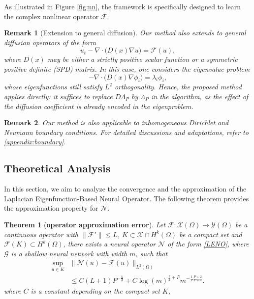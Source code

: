 \documentclass[preprint,12pt]{elsarticle}
\theoremstyle{plain}
\newtheorem{theorem}{Theorem}[section]
\newtheorem{remark}{Remark}[section]
\numberwithin{figure}{section}
\numberwithin{table}{section}
\newcommand{\jdall}[1]{{\color{black}#1}}
\begin{document}
As illustrated in Figure \ref{fig:nn}, the framework is specifically designed to learn the complex nonlinear operator $\mathcal{F}$.

\jdall{
\begin{remark}[Extension to general diffusion]
Our method also extends to general diffusion operators of the form
\begin{equation}
u_t - \nabla \cdot \big(D(x)\nabla u\big) = \mathcal{F}(u),
\end{equation}
where $D(x)$ may be either a strictly positive scalar function or a symmetric positive definite (SPD) matrix. In this case, one considers the eigenvalue problem
\begin{equation}
-\nabla \cdot \big(D(x)\nabla \phi_i\big) = \lambda_i \phi_i,
\end{equation}
whose eigenfunctions still satisfy $L^2$ orthogonality. Hence, the proposed method applies directly: it suffices to replace $D\Lambda_P$ by $\Lambda_P$ in the algorithm, as the effect of the diffusion coefficient is already encoded in the eigenproblem.
\end{remark}
}

\begin{remark}
	Our method is also applicable to inhomogeneous Dirichlet and Neumann boundary conditions. For detailed discussions and adaptations, refer to  \ref{appendix:boundary}.
	
\end{remark}

\subsection{Theoretical Analysis}
In this section, we aim to analyze the convergence and the approximation of the Laplacian Eigenfunction-Based Neural Operator. 
The following theorem provides the approximation property for $\mathcal{N}$.
\begin{theorem}[\bf operator approximation error]
	\label{thm:approxop}
	Let $\mathcal{F}: \mathcal{X}(\Omega)\rightarrow \mathcal{Y}(\Omega)$ be a continuous operator with $\|\mathcal{F}'\|\le L$, $K\subset \mathcal{X}\cap H^k(\Omega)$ be a compact set and $\mathcal{F}(K)\subset H^k(\Omega)$, there exists a neural operator $\mathcal{N}$ of the form \eqref{LENO}, where $\mathcal{G}$ is a shallow neural network with width $m$, such that
	\begin{equation}\label{eq:approxop}
		\begin{aligned}
			\sup_{u\in K} &\|\mathcal{N}(u)-\mathcal{F}(u)\|_{L^2(\Omega)}\\
			&\le C(L+1)P^{-{\frac{k}{d}}}+C\log(m)^{{\frac{1}{2}}+P}m^{-{\frac{1}{P}}{\frac{P+2}{P+4}}}.
		\end{aligned}
	\end{equation}
	where $C$ is a constant depending on the compact set $K$,
\end{theorem}
\end{document}
